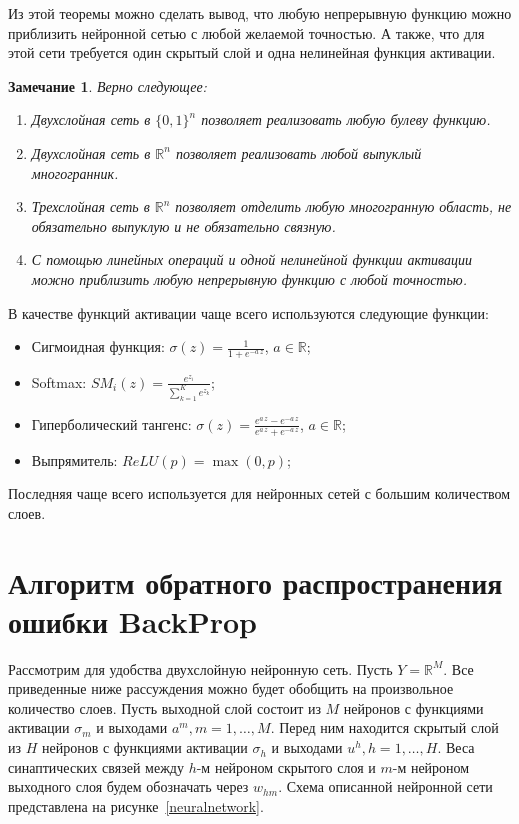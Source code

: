 \documentclass[specialist, 12pt, 
subf, %
href, colorlinks=true,
substylefile = spbu.rtx,
]{disser}
\newtheorem{remark}{Замечание}
\begin{document}
Из этой теоремы можно сделать вывод, что любую непрерывную функцию можно приблизить нейронной сетью с любой желаемой точностью. А также, что для этой сети требуется один скрытый слой и одна нелинейная функция активации. 

\begin{remark}
	Верно следующее:
	\begin{enumerate} 
		\item Двухслойная сеть в $\{0,1\}^n$ позволяет реализовать любую булеву функцию. 
		\item Двухслойная сеть в $\mathbb{R}^n$ позволяет реализовать любой выпуклый многогранник. 
		\item Трехслойная сеть в $\mathbb{R}^n$ позволяет отделить любую многогранную область, не обязательно выпуклую и не обязательно связную. 
		\item С помощью линейных операций и одной нелинейной функции активации можно приблизить любую непрерывную функцию с любой точностью. 
	\end{enumerate}
\end{remark}

В качестве функций активации чаще всего используются следующие функции:
\begin{itemize}
	\item Сигмоидная функция: $\sigma(z) = \frac{1}{1+e^{-a\,z}}$, $a \in \mathbb{R}$;
	
	\item Softmax: $SM_i(z)  = \frac{e^{z_i}}{\sum_{k=1}^{K}e^{z_k}}$;
	\item Гиперболический тангенс: $\sigma(z) = \frac{e^{a\,z} - e^{-a\,z}}{e^{a\,z} + e^{-a\,z}}$, $a \in \mathbb{R}$;
	\item Выпрямитель: $ReLU(p) = \max (0,p)$;
\end{itemize}
Последняя чаще всего используется для нейронных сетей с большим количеством слоев.



\section{Алгоритм обратного распространения ошибки BackProp}


Рассмотрим для удобства двухслойную нейронную сеть. Пусть $Y = \mathbb{R}^M$. Все приведенные ниже рассуждения можно будет обобщить на произвольное количество слоев. Пусть выходной слой состоит из $M$ нейронов с функциями активации $\sigma_m$ и выходами $a^m, m = 1,\ldots,M$. Перед ним находится скрытый слой из $H$ нейронов с функциями активации $\sigma_h$ и выходами $u^h, h = 1, \ldots,H$. Веса синаптических связей между $h$-м нейроном скрытого слоя и $m$-м нейроном выходного слоя будем обозначать через $w_{hm}$. Схема описанной нейронной сети представлена на рисунке~\ref{neuralnetwork}.
\end{document}
